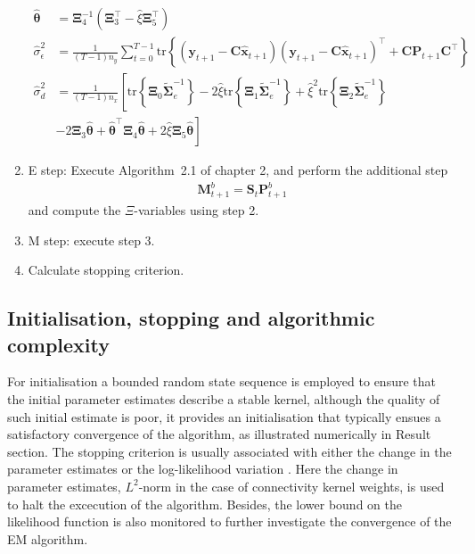 \documentclass[]{article}
\begin{document}
\begin{algorithm}
\begin{enumerate}
\begin{align}
 \hat{\boldsymbol \theta}&=\boldsymbol\Xi_4^{-1}\left(\boldsymbol\Xi_3^\top-\hat{\xi}\boldsymbol\Xi_5^\top \right)\nonumber\\
\hat{\sigma}_{\epsilon}^2&=\frac{1}{(T-1)n_y}\sum_{t=0}^{T-1}\mathrm{tr}\left\lbrace (\mathbf y_{t+1}-\mathbf C\mathbf{\hat{x}}_{t+1}) (\mathbf y_{t+1}-\mathbf C\mathbf{\hat{x}}_{t+1})^\top+\mathbf C \mathbf P_{t+1}\mathbf C^\top \right\rbrace \nonumber\\
\hat{\sigma}_d^2&=\frac{1}{(T-1)n_x}\left[ \mathrm{tr}\left\lbrace \boldsymbol\Xi_0 \tilde{\boldsymbol\Sigma}_e^{-1}\right\rbrace-
2\hat{\xi}\mathrm{tr}\left\lbrace \boldsymbol\Xi_1 \tilde{\boldsymbol\Sigma}_e^{-1}\right\rbrace +\hat{\xi}^2\mathrm{tr} \left\lbrace\boldsymbol\Xi_2\tilde{\boldsymbol\Sigma}_e^{-1}\right\rbrace\right.\nonumber \\ &\left.-2\boldsymbol\Xi_3\hat{\boldsymbol\theta}+\hat{\boldsymbol\theta}^\top\boldsymbol \Xi_4\hat{\boldsymbol\theta}+2\hat{\xi}\boldsymbol\Xi_5 \hat{\boldsymbol\theta}\right] \nonumber
\end{align}
\item E step: Execute Algorithm~2.1 of chapter 2, and perform the additional step
\begin{align}
\mathbf M_{t +1}^{b}=\mathbf S_t\mathbf P_{t+1}^{b} \nonumber
\end{align}
and compute the $\Xi$-variables using step 2.
\item M step: execute step 3.
\item Calculate stopping criterion.
\end{enumerate}
\end{algorithm}
\subsection{Initialisation, stopping and algorithmic complexity}
For initialisation a bounded random state sequence is employed to ensure that the initial parameter estimates describe a stable kernel, although the quality of such initial estimate is poor, it provides an initialisation that typically ensues a satisfactory convergence of the algorithm, as illustrated numerically in Result section. The stopping criterion is usually associated with either the change in the parameter estimates or the log-likelihood variation \cite{McLachlan1997}. Here the change in parameter estimates, $L^2$-norm in the case of connectivity kernel weights, is used to halt the excecution of the algorithm. Besides, the lower bound on the likelihood function is also monitored to further investigate the convergence of the EM algorithm.  
\end{document}
